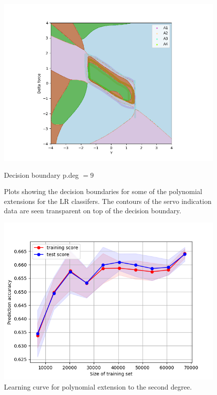 \begin{figure}[]
\begin{minipage}[b]{0.5\linewidth}
                    \centering
                    \includegraphics[width = 1\textwidth]{figures/analysis/logistic_regression/Logistic_Regression_degree9.png}
                    \caption*{Decision boundary p.deg $= 9$}
                \end{minipage}
                \hfill
                \caption{Plots showing the decision boundaries for some of the polynomial extensions for the LR classifers. The contours of the servo indication data are seen transparent on top of the decision boundary.}
                \label{fig:poly_ext_servo}
            \end{figure}
            
            
            \begin{figure}[]
                \centering
                \includegraphics[scale = 0.6]{figures/analysis/logistic_regression/LearningCurves_degree2.png}
                \caption{Learning curve for polynomial extension to the second degree. }
                \label{fig:log_reg_lc}
            \end{figure}
            
